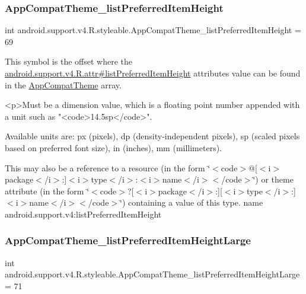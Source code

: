 \subsubsection{\texorpdfstring{App\+Compat\+Theme\+\_\+list\+Preferred\+Item\+Height}{AppCompatTheme\_listPreferredItemHeight}}
{\footnotesize\ttfamily int android.\+support.\+v4.\+R.\+styleable.\+App\+Compat\+Theme\+\_\+list\+Preferred\+Item\+Height = 69\hspace{0.3cm}{\ttfamily [static]}}

This symbol is the offset where the \hyperlink{classandroid_1_1support_1_1v4_1_1R_1_1attr_abbfb3f850012a18672cf64597dc0b519}{android.\+support.\+v4.\+R.\+attr\#list\+Preferred\+Item\+Height} attribute\textquotesingle{}s value can be found in the \hyperlink{classandroid_1_1support_1_1v4_1_1R_1_1styleable_ac07ebbe62ed977f6dcaadc6397840ace}{App\+Compat\+Theme} array.

\begin{DoxyVerb}      <p>Must be a dimension value, which is a floating point number appended with a unit such as "<code>14.5sp</code>".
\end{DoxyVerb}
 Available units are\+: px (pixels), dp (density-\/independent pixels), sp (scaled pixels based on preferred font size), in (inches), mm (millimeters). 

This may also be a reference to a resource (in the form \char`\"{}$<$code$>$@\mbox{[}$<$i$>$package$<$/i$>$\+:\mbox{]}$<$i$>$type$<$/i$>$\+:$<$i$>$name$<$/i$>$$<$/code$>$\char`\"{}) or theme attribute (in the form \char`\"{}$<$code$>$?\mbox{[}$<$i$>$package$<$/i$>$\+:\mbox{]}\mbox{[}$<$i$>$type$<$/i$>$\+:\mbox{]}$<$i$>$name$<$/i$>$$<$/code$>$\char`\"{}) containing a value of this type.  name android.\+support.\+v4\+:list\+Preferred\+Item\+Height \mbox{\label{classandroid_1_1support_1_1v4_1_1R_1_1styleable_a4bf9947a5a52f076cfc439791fc78ac5}} 
\subsubsection{\texorpdfstring{App\+Compat\+Theme\+\_\+list\+Preferred\+Item\+Height\+Large}{AppCompatTheme\_listPreferredItemHeightLarge}}
{\footnotesize\ttfamily int android.\+support.\+v4.\+R.\+styleable.\+App\+Compat\+Theme\+\_\+list\+Preferred\+Item\+Height\+Large = 71\hspace{0.3cm}{\ttfamily [static]}}

